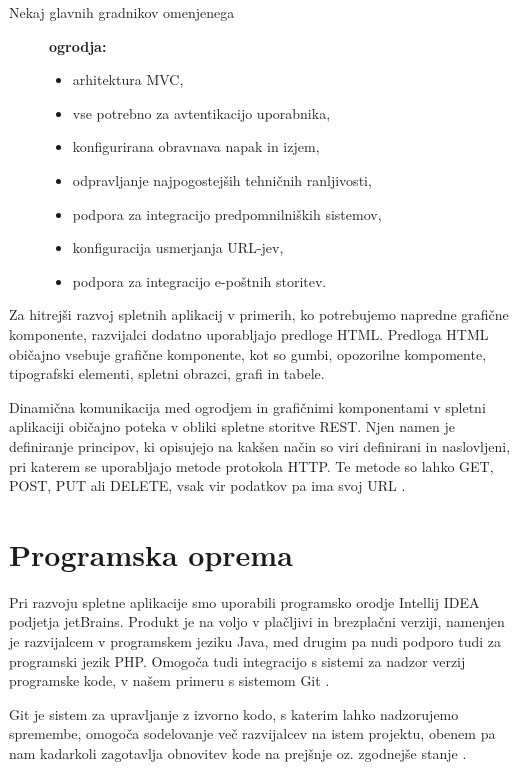 \documentclass[a4paper, 12pt]{book}
\begin{document}
\begin{description}
	
	\item[Nekaj glavnih gradnikov omenjenega]\textbf{ogrodja:}
	
	\begin{itemize}
		\item arhitektura MVC,
		\item vse potrebno za avtentikacijo uporabnika,
		\item konfigurirana obravnava napak in izjem,
		\item odpravljanje najpogostejših tehničnih ranljivosti,
		\item podpora za integracijo predpomnilniških sistemov,
		\item konfiguracija usmerjanja URL-jev,
		\item podpora za integracijo e-poštnih storitev.
		
	\end{itemize}
\end{description}

Za hitrejši razvoj spletnih aplikacij v primerih, ko potrebujemo napredne grafične komponente, razvijalci dodatno uporabljajo predloge HTML. Predloga HTML običajno vsebuje grafične komponente, kot so gumbi, opozorilne kompomente, tipografski elementi, spletni obrazci, grafi in tabele.

Dinamična komunikacija med ogrodjem in grafičnimi komponentami v spletni aplikaciji običajno poteka v obliki spletne storitve REST. Njen namen je definiranje principov, ki opisujejo na kakšen način so viri definirani in naslovljeni, pri katerem se uporabljajo metode protokola HTTP. Te metode so lahko GET, POST, PUT ali DELETE, vsak vir podatkov pa ima svoj URL \cite{protokol-rest}.


\section{Programska oprema}

Pri razvoju spletne aplikacije smo uporabili programsko orodje Intellij IDEA podjetja jetBrains. Produkt je na voljo v plačljivi in brezplačni verziji, namenjen je razvijalcem v programskem jeziku Java, med drugim pa nudi podporo tudi za programski jezik PHP. Omogoča tudi integracijo s sistemi za nadzor verzij programske kode, v našem primeru s sistemom Git \cite{intellij-idea}.

Git je sistem za upravljanje z izvorno kodo, s katerim lahko nadzorujemo spremembe, omogoča sodelovanje več razvijalcev na istem projektu, obenem pa nam kadarkoli zagotavlja obnovitev kode na prejšnje oz. zgodnejše stanje \cite{sistem-git}.
\end{document}
